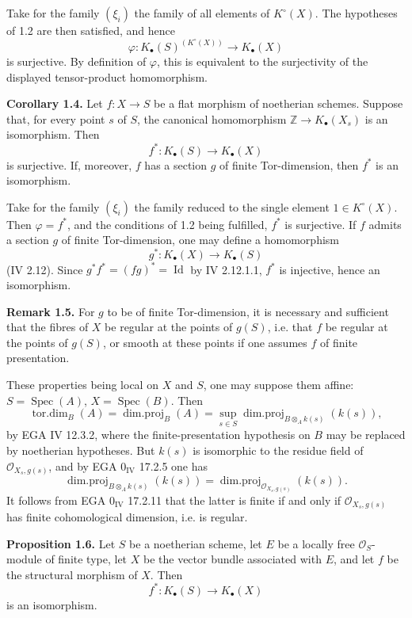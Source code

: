 \documentclass[11pt]{article}
\newcommand{\Spec}{\operatorname{Spec}}
\begin{document}
Take for the family $(\xi_i)$ the family of all elements of $K^\circ(X)$. The hypotheses of 1.2 are then satisfied, and hence
\[
 \varphi:K_\bullet(S)^{(K^\circ(X))}\longrightarrow K_\bullet(X)
\]
is surjective. By definition of $\varphi$, this is equivalent to the surjectivity of the displayed tensor-product homomorphism.

\textbf{Corollary 1.4.} Let $f:X\to S$ be a flat morphism of noetherian schemes. Suppose that, for every point $s$ of $S$, the canonical homomorphism $\mathbb Z\to K_\bullet(X_s)$ is an isomorphism. Then
\[
 f^*:K_\bullet(S)\longrightarrow K_\bullet(X)
\]
is surjective. If, moreover, $f$ has a section $g$ of finite Tor-dimension, then $f^*$ is an isomorphism.

Take for the family $(\xi_i)$ the family reduced to the single element $1\in K^\circ(X)$. Then $\varphi=f^*$, and the conditions of 1.2 being fulfilled, $f^*$ is surjective. If $f$ admits a section $g$ of finite Tor-dimension, one may define a homomorphism
\[
 g^*:K_\bullet(X)\longrightarrow K_\bullet(S)
\]
(IV 2.12). Since $g^*f^*=(fg)^*=\operatorname{Id}$ by IV 2.12.1.1, $f^*$ is injective, hence an isomorphism.

\textbf{Remark 1.5.} For $g$ to be of finite Tor-dimension, it is necessary and sufficient that the fibres of $X$ be regular at the points of $g(S)$, i.e. that $f$ be regular at the points of $g(S)$, or smooth at these points if one assumes $f$ of finite presentation.

These properties being local on $X$ and $S$, one may suppose them affine: $S=\Spec(A)$, $X=\Spec(B)$. Then
\[
 \operatorname{tor.dim}_B(A)=\operatorname{dim.proj}_B(A)=\sup_{s\in S}\operatorname{dim.proj}_{B\otimes_A k(s)}(k(s)),
\]
by EGA IV 12.3.2, where the finite-presentation hypothesis on $B$ may be replaced by noetherian hypotheses. But $k(s)$ is isomorphic to the residue field of $\mathcal O_{X_s,g(s)}$, and by EGA $0_{\mathrm{IV}}$ 17.2.5 one has
\[
 \operatorname{dim.proj}_{B\otimes_A k(s)}(k(s))=
 \operatorname{dim.proj}_{\mathcal O_{X_s,g(s)}}(k(s)).
\]
It follows from EGA $0_{\mathrm{IV}}$ 17.2.11 that the latter is finite if and only if $\mathcal O_{X_s,g(s)}$ has finite cohomological dimension, i.e. is regular.

\textbf{Proposition 1.6.} Let $S$ be a noetherian scheme, let $E$ be a locally free $\mathcal O_S$-module of finite type, let $X$ be the vector bundle associated with $E$, and let $f$ be the structural morphism of $X$. Then
\[
 f^*:K_\bullet(S)\longrightarrow K_\bullet(X)
\]
is an isomorphism.
\end{document}
